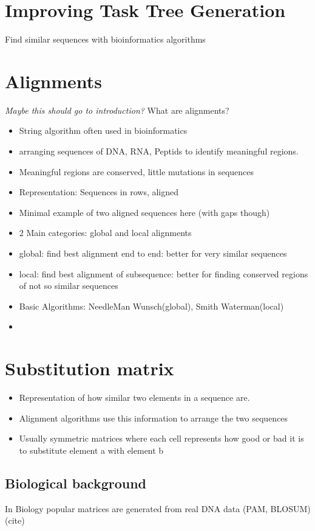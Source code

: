 \section{Improving Task Tree Generation}

Find similar sequences with bioinformatics algorithms
 
\section{Alignments}
\textit{Maybe this should go to introduction?}
What are alignments? 
\begin{itemize}
	\item String algorithm often used in bioinformatics 
	\item arranging sequences of DNA, RNA, Peptids to identify meaningful regions.
	\item Meaningful regions are conserved, little mutations in sequences
	\item Representation: Sequences in rows, aligned 
	\item Minimal example of two aligned sequences here (with gaps though)
	\item 2 Main categories: global and local alignments 
	\item global: find best alignment end to end: better for very similar sequences
	\item local: find best alignment of subsequence: better for finding conserved regions of not so similar sequences
	\item Basic Algorithms: NeedleMan Wunsch(global), Smith Waterman(local) 
	\item 
\end{itemize} 
\section{Substitution matrix}
\begin{itemize}
	\item Representation of how similar two elements in a sequence are. 
	\item Alignment algorithms use this information to arrange the two sequences 
	\item Usually symmetric matrices where each cell represents how good or bad it is to substitute element a with element b 
\end{itemize}
\subsection{Biological background}
In Biology popular matrices are generated from real DNA data (PAM, BLOSUM) (cite)
